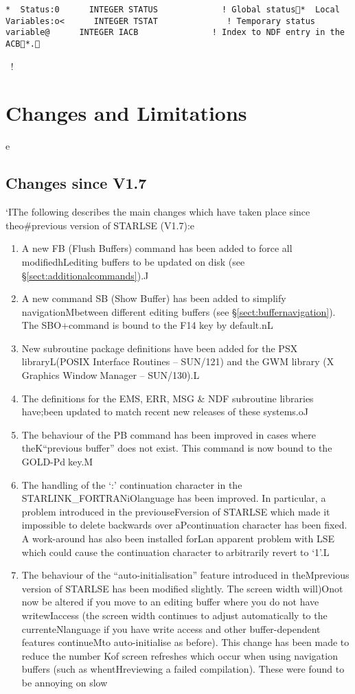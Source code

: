 {\begin{verbatim}
 *  Status:0       INTEGER STATUS             ! Global status   *  Local Variables:o<       INTEGER TSTAT              ! Temporary status variable@       INTEGER IACB               ! Index to NDF entry in the ACB   *. \end{verbatim} \normalsizec   \newpage! \section{Changes and Limitations}e   \subsection{Changes since V1.7}`  I The following describes the main changes which have taken place since theo# previous version of STARLSE (V1.7):e   \begin{enumerate}B  K \item A new FB (Flush Buffers) command has been added to force all modifiedhL editing buffers to be updated on disk (see \S\ref{sect:additionalcommands}).  J \item A new command SB (Show Buffer) has been added to simplify navigationM between different editing buffers (see \S\ref{sect:buffernavigation}). The SBO+ command is bound to the F14 key by default.n  L \item New subroutine package definitions have been added for the PSX libraryL (POSIX Interface Routines -- SUN/121) and the GWM library (X Graphics Window Manager -- SUN/130).  L \item The definitions for the EMS, ERR, MSG \& NDF subroutine libraries have; been updated to match recent new releases of these systems.o  J \item The behaviour of the PB command has been improved in cases where theK ``previous buffer'' does not exist. This command is now bound to the GOLD-Pd key.  M \item The handling of the `:' continuation character in the STARLINK\_FORTRANiO language has been improved. In particular, a problem introduced in the previouseF version of STARLSE which made it impossible to delete backwards over aP continuation character has been fixed. A work-around has also been installed forL an apparent problem with LSE which could cause the continuation character to arbitrarily revert to `1'.  L \item The behaviour of the ``auto-initialisation'' feature introduced in theM previous version of STARLSE has been modified slightly. The screen width will)O not now be altered if you move to an editing buffer where you do not have writewI access (the screen width continues to adjust automatically to the currenteN language if you have write access and other buffer-dependent features continueM to auto-initialise as before). This change has been made to reduce the number K of screen refreshes which occur when using navigation buffers (such as whentH reviewing a failed compilation). These were found to be annoying on slow

\end{enumerate}}
